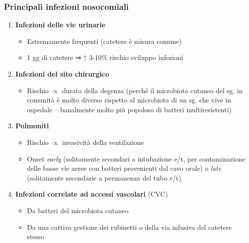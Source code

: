 \documentclass[italian,]{article}
\providecommand{\tightlist}{%
  \setlength{\itemsep}{0pt}\setlength{\parskip}{0pt}}
\begin{document}
\hypertarget{principali-infezioni-nosocomiali}{%
\subsubsection{Principali infezioni
nosocomiali}\label{principali-infezioni-nosocomiali}}

\begin{enumerate}
\def\labelenumi{\arabic{enumi}.}
\tightlist
\item
  \textbf{Infezioni delle vie urinarie}

  \begin{itemize}
  \tightlist
  \item
    Estremamente frequenti (catetere è misura comune)
  \item
    1 gg di catetere ⇒ ↑ 3-10\% rischio sviluppo infezioni
  \end{itemize}
\item
  \textbf{Infezioni del sito chirurgico}

  \begin{itemize}
  \tightlist
  \item
    Rischio \(\propto\) durata della degenza (perché il microbiota
    cutaneo del sg. in comunità è molto diverso rispetto al microbiota
    di un sg. che vive in ospedale -- banalmente molto più popoloso di
    batteri multiresistenti)
  \end{itemize}
\item
  \textbf{Polmoniti}

  \begin{itemize}
  \tightlist
  \item
    Rischio \(\propto\) invasività della ventilazione
  \item
    Onset \emph{early} (solitamente secondari a intubazione e/t, per
    contaminazione delle basse vie aeree con batteri provenienti dal
    cavo orale) o \emph{late} (solitamente secondarie a permanenza del
    tubo e/t)
  \end{itemize}
\item
  \textbf{Infezioni correlate ad accessi vascolari} (CVC)

  \begin{itemize}
  \tightlist
  \item
    Da batteri del microbiota cutaneo
  \item
    Da una cattiva gestione dei rubinetti o della via infusiva del
    catetere stesso
  \end{itemize}
\end{enumerate}
\end{document}
